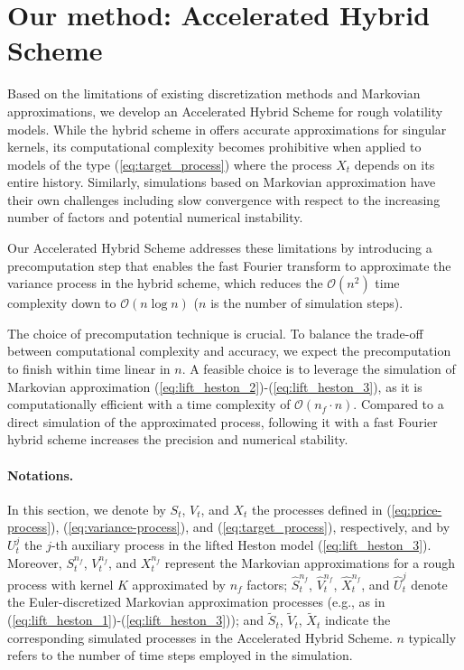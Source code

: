 \documentclass[11pt]{article}%
\theoremstyle{definition}
\begin{document}
\section{Our method: Accelerated Hybrid Scheme}\label{sec:our_method}

Based on the limitations of existing discretization methods and Markovian approximations, we develop an Accelerated Hybrid Scheme for rough volatility models. While the hybrid scheme in \cite{bennedsen_2017_FS} offers accurate approximations for singular kernels, its computational complexity becomes prohibitive when applied to models of the type (\ref{eq:target_process}) where the process \(X_t\) depends on its entire history. Similarly, simulations based on Markovian approximation have their own challenges including slow convergence with respect to the increasing number of factors and potential numerical instability. 

Our Accelerated Hybrid Scheme addresses these limitations by introducing a precomputation step that enables the fast Fourier transform to approximate the variance process in the hybrid scheme, which reduces the \(\mathcal{O}(n^2)\) time complexity down to \(\mathcal{O}(n\log n)\) (\(n\) is the number of simulation steps). 

The choice of precomputation technique is crucial. To balance the trade-off between computational complexity and accuracy, we expect the precomputation to finish within time linear in \(n\). A feasible choice is to leverage the simulation of Markovian approximation (\ref{eq:lift_heston_2})-(\ref{eq:lift_heston_3}), as it is computationally efficient with a time complexity of \(\mathcal{O}(n_f\cdot n)\). Compared to a direct simulation of the approximated process, following it with a fast Fourier hybrid scheme increases the precision and numerical stability.

\paragraph{Notations.} In this section, we denote by \(S_t\), \(V_t\), and \(X_t\) the processes defined in (\ref{eq:price-process}), (\ref{eq:variance-process}), and (\ref{eq:target_process}), respectively, and by \(U_t^j\) the \(j\)-th auxiliary process in the lifted Heston model (\ref{eq:lift_heston_3}). Moreover, \(S_t^{n_f}\), \(V_t^{n_f}\), and \(X_t^{n_f}\) represent the Markovian approximations for a rough process with kernel \(K\) approximated by \(n_f\) factors; \(\widehat{S}_t^{n_f}\), \(\widehat{V}_t^{n_f}\), \(\widehat{X}_t^{n_f}\), and \(\widehat{U}_t^{j}\) denote the Euler-discretized Markovian approximation processes (e.g., as in (\ref{eq:lift_heston_1})-(\ref{eq:lift_heston_3})); and \(\widetilde{S}_t\), \(\widetilde{V}_t\), \(\widetilde{X}_t\) indicate the corresponding simulated processes in the Accelerated Hybrid Scheme. \(n\) typically refers to the number of time steps employed in the simulation.
\end{document}
